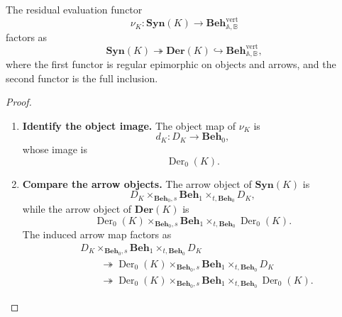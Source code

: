 \begin{theorem}
\label{thm:comparison-level-residual-image}
    The residual evaluation functor
    \[
        \nu_K:
        \mathbf{Syn}(K)\to
        \mathbf{Beh}^{\mathrm{vert}}_{\mathbb A,\mathbb B}
    \]
    factors as
    \[
        \mathbf{Syn}(K)
        \twoheadrightarrow
        \mathbf{Der}(K)
        \hookrightarrow
        \mathbf{Beh}^{\mathrm{vert}}_{\mathbb A,\mathbb B},
    \]
    where the first functor is regular epimorphic on objects and arrows, and the second functor is the full inclusion.
\end{theorem}
\begin{proof}
    \leavevmode
    \begin{enumerate}
        \item \textbf{Identify the object image.} The object map of \(\nu_K\) is
        \[
            d_K:D_K\to\mathbf{Beh}_0,
        \]
        whose image is
        \[
            \operatorname{Der}_0(K).
        \]

        \item \textbf{Compare the arrow objects.} The arrow object of \(\mathbf{Syn}(K)\) is
        \[
            D_K
            \times_{\mathbf{Beh}_0,s}
            \mathbf{Beh}_1
            \times_{t,\mathbf{Beh}_0}
            D_K,
        \]
        while the arrow object of \(\mathbf{Der}(K)\) is
        \[
            \operatorname{Der}_0(K)
            \times_{\mathbf{Beh}_0,s}
            \mathbf{Beh}_1
            \times_{t,\mathbf{Beh}_0}
            \operatorname{Der}_0(K).
        \]
        The induced arrow map factors as
        \[
            \begin{aligned}
                &
                D_K
                \times_{\mathbf{Beh}_0,s}
                \mathbf{Beh}_1
                \times_{t,\mathbf{Beh}_0}
                D_K
                \\
                &\qquad\twoheadrightarrow
                \operatorname{Der}_0(K)
                \times_{\mathbf{Beh}_0,s}
                \mathbf{Beh}_1
                \times_{t,\mathbf{Beh}_0}
                D_K
                \\
                &\qquad\twoheadrightarrow
                \operatorname{Der}_0(K)
                \times_{\mathbf{Beh}_0,s}
                \mathbf{Beh}_1
                \times_{t,\mathbf{Beh}_0}
                \operatorname{Der}_0(K).
            \end{aligned}
        \]


\end{enumerate}
\end{proof}
